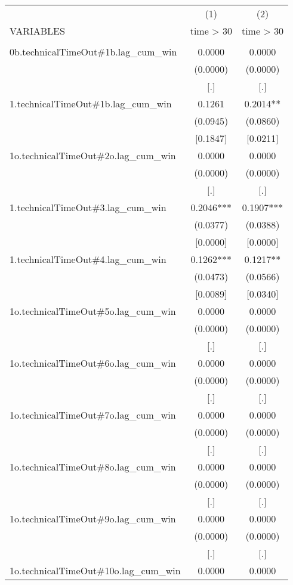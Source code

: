 \documentclass[]{article}
\begin{document}
\begin{tabular}{lcc} \hline
 & (1) & (2) \\
VARIABLES & time > 30 & time > 30 \\ \hline
 &  &  \\
0b.technicalTimeOut\#1b.lag\_cum\_win & 0.0000 & 0.0000 \\
 & (0.0000) & (0.0000) \\
 & [.] & [.] \\
1.technicalTimeOut\#1b.lag\_cum\_win & 0.1261 & 0.2014** \\
 & (0.0945) & (0.0860) \\
 & [0.1847] & [0.0211] \\
1o.technicalTimeOut\#2o.lag\_cum\_win & 0.0000 & 0.0000 \\
 & (0.0000) & (0.0000) \\
 & [.] & [.] \\
1.technicalTimeOut\#3.lag\_cum\_win & 0.2046*** & 0.1907*** \\
 & (0.0377) & (0.0388) \\
 & [0.0000] & [0.0000] \\
1.technicalTimeOut\#4.lag\_cum\_win & 0.1262*** & 0.1217** \\
 & (0.0473) & (0.0566) \\
 & [0.0089] & [0.0340] \\
1o.technicalTimeOut\#5o.lag\_cum\_win & 0.0000 & 0.0000 \\
 & (0.0000) & (0.0000) \\
 & [.] & [.] \\
1o.technicalTimeOut\#6o.lag\_cum\_win & 0.0000 & 0.0000 \\
 & (0.0000) & (0.0000) \\
 & [.] & [.] \\
1o.technicalTimeOut\#7o.lag\_cum\_win & 0.0000 & 0.0000 \\
 & (0.0000) & (0.0000) \\
 & [.] & [.] \\
1o.technicalTimeOut\#8o.lag\_cum\_win & 0.0000 & 0.0000 \\
 & (0.0000) & (0.0000) \\
 & [.] & [.] \\
1o.technicalTimeOut\#9o.lag\_cum\_win & 0.0000 & 0.0000 \\
 & (0.0000) & (0.0000) \\
 & [.] & [.] \\
1o.technicalTimeOut\#10o.lag\_cum\_win & 0.0000 & 0.0000 \\

\end{tabular}
\end{document}
